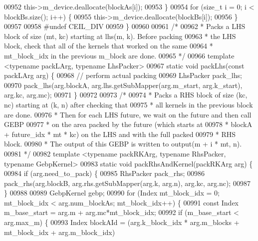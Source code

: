\begin{DoxyCode}
{00952       this->m\_device.deallocate(blockAs[i]);
00953     \}
00954     \textcolor{keywordflow}{for} (\textcolor{keywordtype}{size\_t} i = 0; i < blockBs.size(); i++) \{
00955       this->m\_device.deallocate(blockBs[i]);
00956     \}
00957 
00958 \textcolor{preprocessor}{#undef CEIL\_DIV}
00959   \}
00960 
00961   \textcolor{comment}{/*}
00962 \textcolor{comment}{   * Packs a LHS block of size (mt, kc) starting at lhs(m, k). Before packing}
00963 \textcolor{comment}{   * the LHS block, check that all of the kernels that worked on the same}
00964 \textcolor{comment}{   * mt\_block\_idx in the previous m\_block are done.}
00965 \textcolor{comment}{   */}
00966   \textcolor{keyword}{template} <\textcolor{keyword}{typename} packLArg, \textcolor{keyword}{typename} LhsPacker>
00967   \textcolor{keyword}{static} \textcolor{keywordtype}{void} packLhs(\textcolor{keyword}{const} packLArg arg) \{
00968     \textcolor{comment}{// perform actual packing}
00969     LhsPacker pack\_lhs;
00970     pack\_lhs(arg.blockA, arg.lhs.getSubMapper(arg.m\_start, arg.k\_start), arg.kc, arg.mc);
00971   \}
00972 
00973   \textcolor{comment}{/*}
00974 \textcolor{comment}{   * Packs a RHS block of size (kc, nc) starting at (k, n) after checking that}
00975 \textcolor{comment}{   * all kernels in the previous block are done.}
00976 \textcolor{comment}{   * Then for each LHS future, we wait on the future and then call GEBP}
00977 \textcolor{comment}{   * on the area packed by the future (which starts at}
00978 \textcolor{comment}{   * blockA + future\_idx * mt * kc) on the LHS and with the full packed}
00979 \textcolor{comment}{   * RHS block.}
00980 \textcolor{comment}{   * The output of this GEBP is written to output(m + i * mt, n).}
00981 \textcolor{comment}{   */}
00982   \textcolor{keyword}{template} <\textcolor{keyword}{typename} packRKArg, \textcolor{keyword}{typename} RhsPacker, \textcolor{keyword}{typename} GebpKernel>
00983   \textcolor{keyword}{static} \textcolor{keywordtype}{void} packRhsAndKernel(packRKArg arg) \{
00984     \textcolor{keywordflow}{if} (arg.need\_to\_pack) \{
00985       RhsPacker pack\_rhs;
00986       pack\_rhs(arg.blockB, arg.rhs.getSubMapper(arg.k, arg.n), arg.kc, arg.nc);
00987     \}
00988 
00989     GebpKernel gebp;
00990     \textcolor{keywordflow}{for} (Index mt\_block\_idx = 0; mt\_block\_idx < arg.num\_blockAs; mt\_block\_idx++) \{
00991       \textcolor{keyword}{const} Index m\_base\_start = arg.m + arg.mc*mt\_block\_idx;
00992       \textcolor{keywordflow}{if} (m\_base\_start < arg.max\_m) \{
00993         Index blockAId = (arg.k\_block\_idx * arg.m\_blocks + mt\_block\_idx + arg.m\_block\_idx) %
}
\end{DoxyCode}
